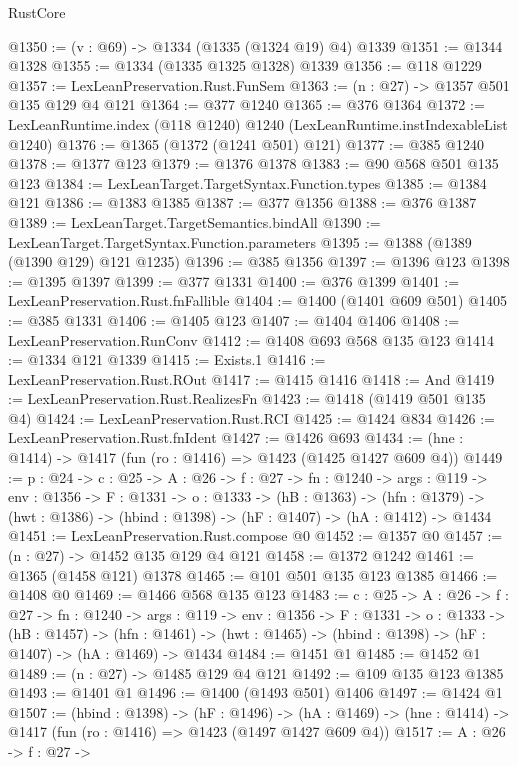 \begin{lexlean}{RustCore}
\begin{coremodule}
@1350 := (v : @69) -> @1334 (@1335 (@1324 @19) @4) @1339
@1351 := @1344 @1328
@1355 := @1334 (@1335 @1325 @1328) @1339
@1356 := @118 @1229
@1357 := LexLeanPreservation.Rust.FunSem
@1363 := (n : @27) -> @1357 @501 @135 @129 @4 @121
@1364 := @377 @1240
@1365 := @376 @1364
@1372 := LexLeanRuntime.index (@118 @1240) @1240 (LexLeanRuntime.instIndexableList @1240)
@1376 := @1365 (@1372 (@1241 @501) @121)
@1377 := @385 @1240
@1378 := @1377 @123
@1379 := @1376 @1378
@1383 := @90 @568 @501 @135 @123
@1384 := LexLeanTarget.TargetSyntax.Function.types
@1385 := @1384 @121
@1386 := @1383 @1385
@1387 := @377 @1356
@1388 := @376 @1387
@1389 := LexLeanTarget.TargetSemantics.bindAll
@1390 := LexLeanTarget.TargetSyntax.Function.parameters
@1395 := @1388 (@1389 (@1390 @129) @121 @1235)
@1396 := @385 @1356
@1397 := @1396 @123
@1398 := @1395 @1397
@1399 := @377 @1331
@1400 := @376 @1399
@1401 := LexLeanPreservation.Rust.fnFallible
@1404 := @1400 (@1401 @609 @501)
@1405 := @385 @1331
@1406 := @1405 @123
@1407 := @1404 @1406
@1408 := LexLeanPreservation.RunConv
@1412 := @1408 @693 @568 @135 @123
@1414 := @1334 @121 @1339
@1415 := Exists.{1}
@1416 := LexLeanPreservation.Rust.ROut
@1417 := @1415 @1416
@1418 := And
@1419 := LexLeanPreservation.Rust.RealizesFn
@1423 := @1418 (@1419 @501 @135 @4)
@1424 := LexLeanPreservation.Rust.RCI
@1425 := @1424 @834
@1426 := LexLeanPreservation.Rust.fnIdent
@1427 := @1426 @693
@1434 := (hne : @1414) -> @1417 (fun (ro : @1416) => @1423 (@1425 @1427 @609 @4))
@1449 := {p : @24} ->
  {c : @25} ->
  {A : @26} ->
  {f : @27} ->
  {fn : @1240} ->
  {args : @119} ->
  {env : @1356} ->
  {F : @1331} ->
  {o : @1333} ->
  (hB : @1363) ->
  (hfn : @1379) -> (hwt : @1386) -> (hbind : @1398) -> (hF : @1407) -> (hA : @1412) -> @1434
@1451 := LexLeanPreservation.Rust.compose @0
@1452 := @1357 @0
@1457 := (n : @27) -> @1452 @135 @129 @4 @121
@1458 := @1372 @1242
@1461 := @1365 (@1458 @121) @1378
@1465 := @101 @501 @135 @123 @1385
@1466 := @1408 @0
@1469 := @1466 @568 @135 @123
@1483 := {c : @25} ->
  {A : @26} ->
  {f : @27} ->
  {fn : @1240} ->
  {args : @119} ->
  {env : @1356} ->
  {F : @1331} ->
  {o : @1333} ->
  (hB : @1457) ->
  (hfn : @1461) -> (hwt : @1465) -> (hbind : @1398) -> (hF : @1407) -> (hA : @1469) -> @1434
@1484 := @1451 @1
@1485 := @1452 @1
@1489 := (n : @27) -> @1485 @129 @4 @121
@1492 := @109 @135 @123 @1385
@1493 := @1401 @1
@1496 := @1400 (@1493 @501) @1406
@1497 := @1424 @1
@1507 := (hbind : @1398) ->
  (hF : @1496) ->
  (hA : @1469) -> (hne : @1414) -> @1417 (fun (ro : @1416) => @1423 (@1497 @1427 @609 @4))
@1517 := {A : @26} ->
  {f : @27} ->

\end{coremodule}
\end{lexlean}
